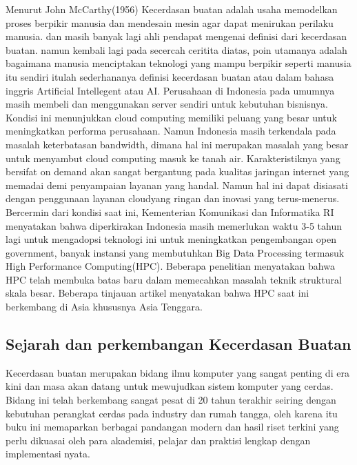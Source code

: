 \hspace{1cm} Menurut John McCarthy(1956) Kecerdasan buatan adalah usaha memodelkan proses berpikir manusia dan mendesain mesin agar dapat menirukan perilaku manusia. dan masih banyak lagi ahli pendapat mengenai definisi dari kecerdasan buatan. namun kembali lagi pada secercah ceritita diatas, poin utamanya adalah bagaimana manusia menciptakan teknologi yang mampu berpikir seperti manusia itu sendiri itulah sederhananya definisi kecerdasan buatan atau dalam bahasa inggris Artificial Intellegent atau AI. Perusahaan di Indonesia pada umumnya masih membeli dan menggunakan server sendiri untuk kebutuhan bisnisnya. Kondisi  ini  menunjukkan cloud  computing memiliki peluang yang besar untuk meningkatkan performa perusahaan.    Namun  Indonesia  masih terkendala  pada  masalah keterbatasan bandwidth, dimana  hal  ini  merupakan  masalah  yang  besar  untuk menyambut cloud   computing masuk   ke   tanah   air. Karakteristiknya yang bersifat on demand akan sangat bergantung pada kualitas jaringan internet yang memadai  demi  penyampaian layanan   yang handal. Namun  hal  ini  dapat  disiasati dengan penggunaan layanan cloudyang  ringan  dan  inovasi  yang terus-menerus. Bercermin dari kondisi saat ini, Kementerian Komunikasi  dan  Informatika  RI  menyatakan  bahwa diperkirakan Indonesia  masih  memerlukan waktu 3-5 tahun  lagi untuk  mengadopsi  teknologi  ini untuk    meningkatkan   pengembangan open government, banyak  instansi  yang membutuhkan Big Data Processing termasuk High Performance Computing(HPC). Beberapa  penelitian  menyatakan bahwa HPC  telah membuka batas baru dalam memecahkan  masalah  teknik  struktural  skala  besar. Beberapa tinjauan artikel menyatakan bahwa HPC saat ini  berkembang  di Asia khususnya  Asia  Tenggara.

\subsection{Sejarah dan perkembangan Kecerdasan Buatan}
\hspace{1cm} Kecerdasan buatan merupakan bidang ilmu komputer yang sangat penting di era kini dan masa akan datang untuk mewujudkan sistem komputer yang cerdas.  Bidang ini telah berkembang sangat pesat di 20 tahun terakhir seiring dengan kebutuhan perangkat cerdas pada industry dan rumah tangga, oleh karena itu buku ini memaparkan berbagai pandangan modern dan hasil riset terkini  yang perlu dikuasai oleh para akademisi, pelajar dan praktisi lengkap dengan implementasi nyata.

